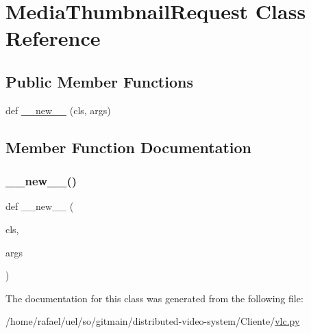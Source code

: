 \hypertarget{classvlc_1_1_media_thumbnail_request}{}\section{Media\+Thumbnail\+Request Class Reference}
\label{classvlc_1_1_media_thumbnail_request}
\subsection*{Public Member Functions}
\begin{DoxyCompactItemize}
\item 
def \hyperlink{classvlc_1_1_media_thumbnail_request_acc2aa3fac6a63e8bac4f19efc327102b}{\+\_\+\+\_\+new\+\_\+\+\_\+} (cls, args)
\end{DoxyCompactItemize}


\subsection{Member Function Documentation}
\mbox{\label{classvlc_1_1_media_thumbnail_request_acc2aa3fac6a63e8bac4f19efc327102b}} 
\subsubsection{\texorpdfstring{\+\_\+\+\_\+new\+\_\+\+\_\+()}{\_\_new\_\_()}}
{\footnotesize\ttfamily def \+\_\+\+\_\+new\+\_\+\+\_\+ (\begin{DoxyParamCaption}\item[{}]{cls,  }\item[{}]{args }\end{DoxyParamCaption})}



The documentation for this class was generated from the following file\+:\begin{DoxyCompactItemize}
\item 
/home/rafael/uel/so/gitmain/distributed-\/video-\/system/\+Cliente/\hyperlink{vlc_8py}{vlc.\+py}\end{DoxyCompactItemize}
